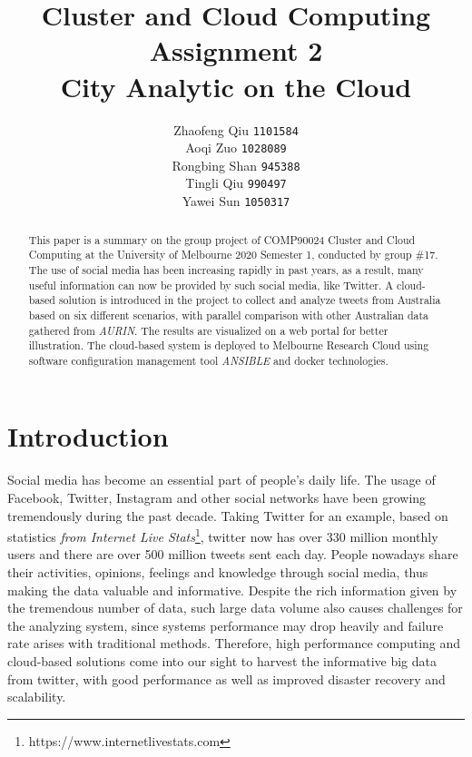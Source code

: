 \documentclass{article}
\title{Cluster and Cloud Computing Assignment 2
		\\ City Analytic on the Cloud} %
\author{ Zhaofeng Qiu \texttt{1101584}
        \\ Aoqi Zuo \texttt{1028089}
        \\Rongbing Shan \texttt{945388}
        \\Tingli Qiu \texttt{990497}
        \\Yawei Sun \texttt{1050317}}%
\begin{document}
\maketitle %

\begin{abstract}
This paper is a summary on the group project of COMP90024 Cluster and Cloud Computing at the University of Melbourne 2020 Semester 1, conducted by group \#17. The use of social media has been increasing rapidly in past years, as a result, many useful information can now be provided by such social media, like Twitter. A cloud-based solution is introduced in the project to collect and analyze tweets from Australia based on 
six different scenarios, with parallel comparison with other Australian data gathered from \textit{AURIN}. The results are visualized on a web portal for better illustration. The cloud-based system is deployed to Melbourne Research Cloud using software configuration management tool \textit{ANSIBLE} and docker technologies. 
\end{abstract}

\section{Introduction}
Social media has become an essential part of people’s daily life. The usage of Facebook, Twitter, Instagram and other social networks have been growing tremendously during the past decade. Taking Twitter for an example, based on statistics \textit{from Internet Live Stats}\footnote{https://www.internetlivestats.com}, twitter now has over 330 million monthly users and there are over 500 million tweets sent each day. People nowadays share their activities, opinions, feelings and knowledge through social media, thus making the data valuable and informative. Despite the rich information given by the tremendous number of data, such large data volume also causes challenges for the analyzing system, since systems performance may drop heavily and failure rate arises with traditional methods. Therefore, high performance computing and cloud-based solutions come into our sight to harvest the informative big data from twitter, with good performance as well as improved disaster recovery and scalability.
\end{document}
